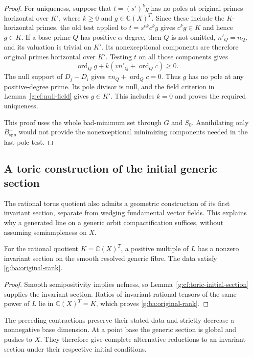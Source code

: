 \begin{proof}
For uniqueness, suppose that $t=(s')^kg$ has no poles at original
primes horizontal over $K'$, where $k\geq0$ and
$g\in\mathbb C(X)^T$. Since these include the $K$-horizontal primes,
the old test applied to $t=s^{vk}c^kg$ gives $c^kg\in K$ and
hence $g\in K$. If a base prime $Q$ has positive $\alpha$-degree,
then $Q$ is not omitted, $n'_Q=n_Q$, and its valuation is trivial
on $K'$. Its nonexceptional components are therefore original
primes horizontal over $K'$. Testing $t$ on all those components
gives
\[
 \operatorname{ord}_Q g+
       k(vn'_Q+\operatorname{ord}_Q c)\geq0.
\]
The null support of $D_j-D_i$ gives
$vn_Q+\operatorname{ord}_Q c=0$. Thus $g$ has no pole at any
positive-degree prime. Its pole divisor is null, and the field
criterion in Lemma~\ref{g:cf:null-field} gives $g\in K'$.
This includes $k=0$ and proves the required uniqueness.

This proof uses the whole bad-minimum set through $G$ and $S_0$.
Annihilating only $B_{\mathrm{sgn}}^-$ would not provide the
nonexceptional minimizing components needed in the last pole test.
\end{proof}

\subsection{A toric construction of the initial generic section}
\label{g:ba:toric-start}

The rational torus quotient also admits a geometric construction of its
first invariant section, separate from wedging fundamental vector
fields.  This explains why a generated line on a generic orbit
compactification suffices, without assuming semiampleness on $X$.

\begin{proposition}\label{g:ba:toric-section}
For the rational quotient $K=\mathbb C(X)^T$, a positive multiple of
$L$ has a nonzero invariant section on the smooth resolved generic
fibre.  The data satisfy \eqref{g:ba:original-rank}.
\end{proposition}

\begin{proof}
Smooth semipositivity implies nefness, so
Lemma~\ref{g:cf:toric-initial-section} supplies the invariant section.
Ratios of invariant rational tensors of the same power of \(L\) lie in
\(\mathbb C(X)^T=K\), which proves \eqref{g:ba:original-rank}.
\end{proof}

The preceding contractions preserve their stated data and strictly
decrease a nonnegative base dimension.  At a point base the generic
section is global and pushes to $X$.  They therefore give complete
alternative reductions to an invariant section under their respective
initial conditions.
